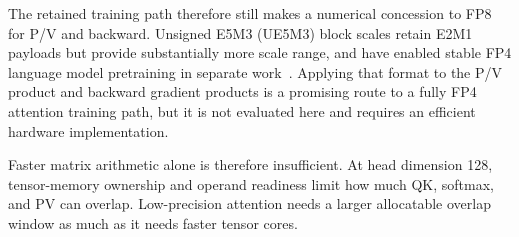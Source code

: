 The retained training path therefore still makes a numerical concession to
FP8 for P/V and backward.  Unsigned E5M3 (UE5M3) block scales retain E2M1
payloads but provide substantially more scale range, and have enabled stable
FP4 language model pretraining in separate work~\cite{hu2026ue5m3}.  Applying
that format to the P/V product and backward gradient products is a promising
route to a fully FP4 attention training path, but it is not evaluated here and
requires an efficient hardware implementation.

Faster matrix arithmetic alone is therefore insufficient.  At head dimension
128, tensor-memory ownership and operand readiness limit how much QK, softmax,
and PV can overlap.  Low-precision attention needs a larger allocatable
overlap window as much as it needs faster tensor cores.
